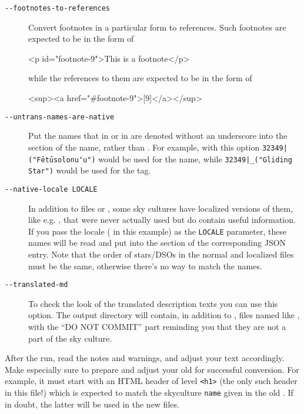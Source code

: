\begin{description}
\item[\texttt{-\/-footnotes-to-references}] Convert footnotes in a particular form to references. Such footnotes are expected to be in the form of
\begin{htmlbit}
<p id="footnote-9">This is a footnote</p>
\end{htmlbit}
while the references to them are expected to be in the form of
\begin{htmlbit}
<sup><a href="#footnote-9">[9]</a></sup>
\end{htmlbit}
\item[\texttt{-\/-untrans-names-are-native}] Put the names that in  or in 
       are denoted without an underscore into the  section of the name, 
      rather than . For example, with this option \texttt{32349|("Fētūsolonuʻu")} would be 
      used for the  name, while \texttt{32349|\_("Gliding Star")} would be used for the  tag.
\item[\texttt{-\/-native-locale LOCALE}] In addition to files  or , 
      some sky cultures have localized versions of them, like e.g. , 
      that were never actually used but do contain useful information. If you pass the locale ( in this example) 
      as the \texttt{LOCALE} parameter, these names will be read and put into the  section of the corresponding JSON entry. 
      Note that the order of stars/DSOs in the normal and localized files must be the same, otherwise there's no way to match the names.
\item[\texttt{-\/-translated-md}] To check the look of the translated description texts you can use this option. 
      The output directory will contain, in addition to , files named like 
      , with the ``DO NOT COMMIT'' part reminding you that they are not a part of the sky culture.
\end{description}

\noindent After the run, read the notes and warnings, and adjust your text accordingly. 
Make especially sure to prepare and adjust your old  for successful conversion.
For example, it must start with an HTML header of level \texttt{<h1>} (the only such header in this file!) which is expected 
to match the skyculture \texttt{name} given in the old . If in doubt, the latter will be used in the new files.

